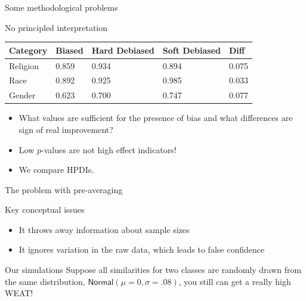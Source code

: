 \documentclass[
  10pt,
  ignorenonframetext,
  x11names, dvipsnames, bibspacing,natbib, table]{beamer}
\providecommand{\tightlist}{%
  \setlength{\itemsep}{0pt}\setlength{\parskip}{0pt}}
\begin{document}
\begin{frame}{Some methodological problems}
\protect\hypertarget{some-methodological-problems-5}{}
\begin{block}{No principled interpretation}
\protect\hypertarget{no-principled-interpretation}{}
\begin{longtable}[]{@{}lllll@{}}
\toprule
Category & Biased & Hard Debiased & Soft Debiased & Diff \\
\midrule
\endhead
Religion & 0.859 & 0.934 & 0.894 & 0.075 \\
Race & 0.892 & 0.925 & 0.985 & 0.033 \\
Gender & 0.623 & 0.700 & 0.747 & 0.077 \\
\bottomrule
\end{longtable}

\begin{itemize}
\item
  What values are sufficient for the presence of bias and what
  differences are sign of real improvement?
\item
  Low \(p\)-values are not high effect indicators!
\item
  We compare HPDIs.
\end{itemize}
\end{block}
\end{frame}

\begin{frame}{The problem with pre-averaging}
\protect\hypertarget{the-problem-with-pre-averaging}{}
\begin{block}{Key conceptual issues}
\protect\hypertarget{key-conceptual-issues}{}
\begin{itemize}
\tightlist
\item
  It throws away information about sample sizes
\item
  It ignores variation in the raw data, which leads to false confidence
\end{itemize}

\pause
\end{block}

\begin{block}{Our simulations}
\protect\hypertarget{our-simulations}{}
Suppose all similarities for two classes are randomly drawn from the
same distribution, \(\mathsf{Normal}(\mu = 0, \sigma = .08)\), you still
can get a really high WEAT!
\end{block}
\end{frame}
\end{document}
